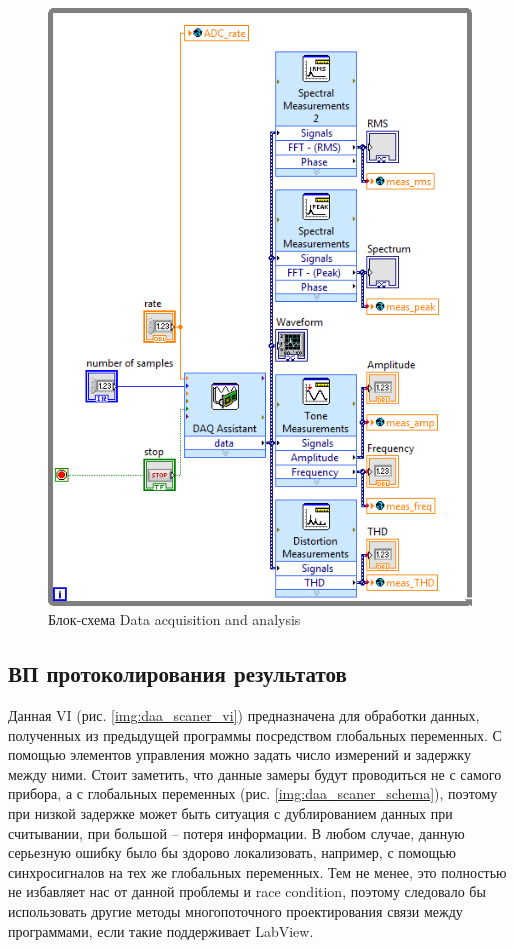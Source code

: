 \documentclass[a4paper,14pt]{article}
\begin{document}
\begin{figure}[H]
	\centering
	\includegraphics[width=\linewidth]{image/daa_schema}
	\caption{Блок-схема Data acquisition and analysis}\label{img:daa_schema}
\end{figure}

\subsection{ВП протоколирования результатов}

\label{subs:proto}

Данная VI (рис. \ref{img:daa_scaner_vi}) предназначена для обработки данных, полученных из предыдущей программы посредством глобальных переменных.
С помощью элементов управления можно задать число измерений и задержку между ними.
Стоит заметить, что данные замеры будут проводиться не с самого прибора, а с глобальных переменных (рис. \ref{img:daa_scaner_schema}), поэтому при низкой задержке может быть ситуация с дублированием данных при считывании, при большой -- потеря информации.
В любом случае, данную серьезную ошибку было бы здорово локализовать, например, с помощью синхросигналов на тех же глобальных переменных.
Тем не менее, это полностью не избавляет нас от данной проблемы и race condition, поэтому следовало бы использовать другие методы многопоточного проектирования связи между программами, если такие поддерживает LabView.
\end{document}
